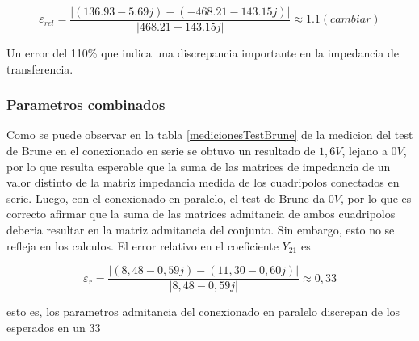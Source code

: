 












\[
\varepsilon_{rel} = \frac{|(136.93 - 5.69j) - (-468.21 - 143.15j)|}{|468.21 + 143.15j|} \approx 1.1 (cambiar)
\]



Un error del 110\% que indica una discrepancia importante en la impedancia de transferencia.

\subsubsection{Parametros combinados}
Como se puede observar en la tabla \ref{medicionesTestBrune} de la medicion del test de Brune en el conexionado en serie se obtuvo un resultado de $1,6 V$, lejano a $0 V$, por lo que resulta esperable que la suma de las matrices de impedancia de un valor distinto de la matriz impedancia medida de los cuadripolos conectados en serie. Luego, con el conexionado en paralelo, el test de Brune da $0 V$, por lo que es correcto afirmar que la suma de las matrices admitancia de ambos cuadripolos deberia resultar en la matriz admitancia del conjunto. Sin embargo, esto no se refleja en los calculos. El error relativo en el coeficiente $Y_{21}$ es

\begin{equation*}
    \varepsilon_r = \frac{\left| (8,48 - 0,59j) - (11,30 - 0,60j) \right|} {\left| 8,48 - 0,59j \right|} \approx 0,33
\end{equation*}

esto es, los parametros admitancia del conexionado en paralelo discrepan de los esperados en un 33%
